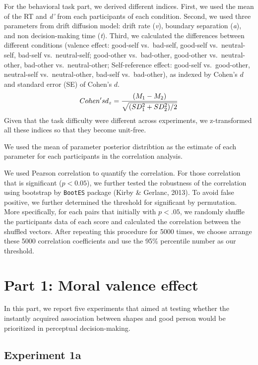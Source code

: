 \documentclass[
  english,
  man]{apa6}
\begin{document}
For the behavioral task part, we derived different indices. First, we used the mean of the RT and \emph{d'} from each participants of each condition. Second, we used three parameters from drift diffusion model: drift rate (\emph{v}), boundary separation (\emph{a}), and non decision-making time (\emph{t}). Third, we calculated the differences between different conditions (valence effect: good-self vs.~bad-self, good-self vs.~neutral-self, bad-self vs.~neutral-self; good-other vs.~bad-other, good-other vs.~neutral-other, bad-other vs.~neutral-other; Self-reference effect: good-self vs.~good-other, neutral-self vs.~neutral-other, bad-self vs.~bad-other), as indexed by Cohen's \(d\) and standard error (SE) of Cohen's \(d\).
\[ Cohen's \space d_{z} = \frac {(M_{1} - M_{2})} {\sqrt{(SD_{1}^2 + SD_{2}^2)/2}}\]
Given that the task difficulty were different across experiments, we z-transformed all these indices so that they become unit-free.

We used the mean of parameter posterior distribtion as the estimate of each parameter for each participants in the correlation analysis.

We used Pearson correlation to quantify the correlation. For those correlation that is significant (\(p < 0.05\)), we further tested the robustness of the correlation using bootstrap by \texttt{BootES} package (Kirby \& Gerlanc, 2013). To avoid false positive, we further determined the threshold for significant by permutation. More specifically, for each pairs that initially with \(p < .05\), we randomly shuffle the participants data of each score and calculated the correlation between the shuffled vectors. After repeating this procedure for 5000 times, we choose arrange these 5000 correlation coefficients and use the 95\% percentile number as our threshold.

\hypertarget{part-1-moral-valence-effect}{%
\section{Part 1: Moral valence effect}\label{part-1-moral-valence-effect}}

In this part, we report five experiments that aimed at testing whether the instantly acquired association between shapes and good person would be prioritized in perceptual decision-making.

\hypertarget{experiment-1a}{%
\subsection{Experiment 1a}\label{experiment-1a}}
\end{document}

